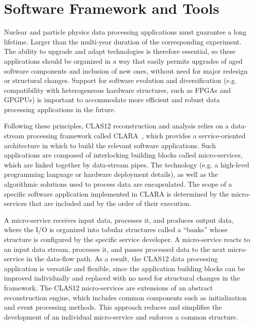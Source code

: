 \section{Software Framework and Tools}
\label{sec:framework}

Nuclear and particle physics data processing applications must guarantee a long lifetime.  Larger than the multi-year
duration of the corresponding experiment. The ability to upgrade and adapt technologies is therefore essential, so
these applications should be organized in a way that easily permits upgrades of aged software components and
inclusion of new ones, without need for major redesign or structural changes.  Support for software evolution and
diversification (e.g. compatibility with heterogeneous hardware structures, such as FPGAs and GPGPUs) is important
to accommodate more efficient and robust data processing applications in the future.

Following these principles, CLAS12 reconstruction and analysis relies on a data-stream processing framework called
CLARA~\cite{clara-2011,clara-service,framework,clara-2016}, which provides a service-oriented architecture in which
to build the relevant software applications.  Such applications are composed of interlocking building blocks called
micro-services, which are linked together by data-stream pipes.  The technology (e.g. a high-level programming
language or hardware deployment details), as well as the algorithmic solutions used to process data are encapsulated. 
The scope of a specific software application implemented in CLARA is determined
by the micro-services that are included and by the order of their execution.

A micro-service receives input data, processes it, and produces output data, where the I/O is organized into  tabular structures called a ``banks''
whose structure is configured by the specific service developer.  A micro-service reacts to an input data stream,
processes it, and passes processed data to the next micro-service in the data-flow path.  As a result, the CLAS12
data processing application is versatile and flexible, since the application building blocks can be improved individually
and replaced with no need for structural changes in the framework. The CLAS12 micro-services are extensions of an
abstract reconstruction engine, which includes common components such as initialization and event processing
methods. This approach reduces and simplifies the development of an individual micro-service and enforces a common
structure. 

